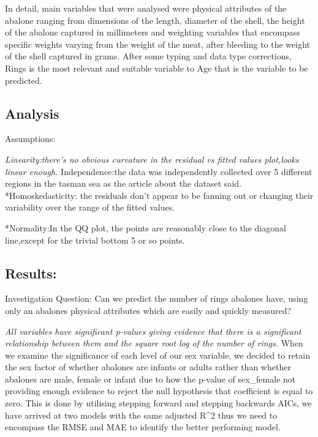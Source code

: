 \documentclass[letterpaper,9pt,twocolumn,twoside,]{pinp}
\begin{document}
In detail, main variables that were analysed were physical attributes of
the abalone ranging from dimensions of the length, diameter of the
shell, the height of the abalone captured in millimeters and weighting
variables that encompass specific weights varying from the weight of the
meat, after bleeding to the weight of the shell captured in grams. After
some typing and data type corrections, Rings is the most relevant and
suitable variable to Age that is the variable to be predicted.

\hypertarget{analysis}{%
\subsection{Analysis}\label{analysis}}

Assumptions:

\emph{Linearity:there's no obvious curvature in the residual vs fitted
values plot,looks linear enough. }Independence:the data was
independently collected over 5 different regions in the tasman sea as
the article about the dataset said. *Homoskedasticity: the residuals
don't appear to be fanning out or changing their variability over the
range of the fitted values.

*Normality:In the QQ plot, the points are reasonably close to the
diagonal line,except for the trivial bottom 5 or so points.

\hypertarget{results}{%
\subsection{Results:}\label{results}}

Investigation Question: Can we predict the number of rings abalones
have, using only an abalones physical attributes which are easily and
quickly measured?

\emph{All variables have significant p-values giving evidence that there
is a significant relationship between them and the square root log of
the number of rings. }When we examine the significance of each level of
our sex variable, we decided to retain the sex factor of whether
abalones are infants or adults rather than whether abalones are male,
female or infant due to how the p-value of sex\_female not providing
enough evidence to reject the null hypothesis that coefficient is equal
to zero. This is done by utilising stepping forward and stepping
backwards AICs, we have arrived at two models with the same adjusted
R\^{}2 thus we need to encompass the RMSE and MAE to identify the better
performing model.
\end{document}
